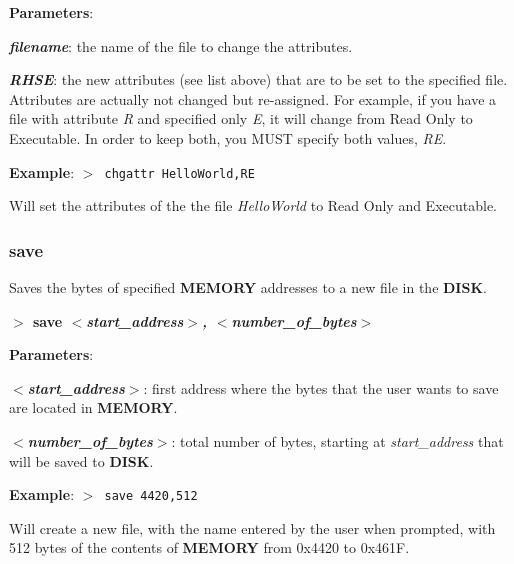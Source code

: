\documentclass[a4paper,11pt]{article}
\begin{document}
        \textbf{Parameters}:

        \hspace{1cm}\textbf{\textit{filename}}: the name of the file to change
        the attributes.

        \hspace{1cm}\textbf{\textit{RHSE}}: the new attributes (see list above)
        that are to be set to the specified file. Attributes are actually not
        changed but re-assigned. For example, if you have a file with attribute
        \textit{R} and specified only \textit{E}, it will change from Read Only
        to Executable. In order to keep both, you MUST specify both values,
        \textit{RE}.
        
        \textbf{Example}: \texttt{$>$ chgattr HelloWorld,RE}

        Will set the attributes of the the file \textit{HelloWorld} to Read Only
        and Executable.

        \subsubsection{{\color{blue}save}}
        Saves the bytes of specified \textbf{MEMORY} addresses to a new file in
        the \textbf{DISK}.

        \hspace{1.9cm}\textbf{$>$ save \textit{$<$start\_address$>$,
        $<$number\_of\_bytes$>$}}

        \textbf{Parameters}:

        \hspace{1cm}\textbf{\textit{$<$start\_address$>$}}: first address where
        the bytes that the user wants to save are located in \textbf{MEMORY}.

        \hspace{1cm}\textbf{\textit{$<$number\_of\_bytes$>$}}: total number of
        bytes, starting at \textit{start\_address} that will be saved to
        \textbf{DISK}.
        
        \textbf{Example}: \texttt{$>$ save 4420,512}

        Will create a new file, with the name entered by the user when prompted,
        with 512 bytes of the contents of \textbf{MEMORY} from 0x4420 to 0x461F.

\end{document}
